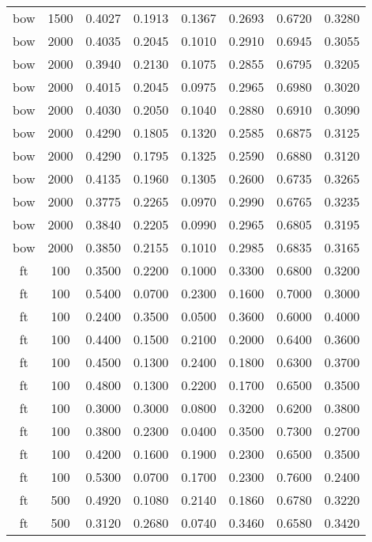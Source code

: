 \begin{scriptsize}
\begin{longtable}{cccccccc}
	bow      & 1500 & 0.4027 & 0.1913 & 0.1367 & 0.2693 & 0.6720 & 0.3280 \\
	bow      & 2000 & 0.4035 & 0.2045 & 0.1010 & 0.2910 & 0.6945 & 0.3055 \\
	bow      & 2000 & 0.3940 & 0.2130 & 0.1075 & 0.2855 & 0.6795 & 0.3205 \\
	bow      & 2000 & 0.4015 & 0.2045 & 0.0975 & 0.2965 & 0.6980 & 0.3020 \\
	bow      & 2000 & 0.4030 & 0.2050 & 0.1040 & 0.2880 & 0.6910 & 0.3090 \\
	bow      & 2000 & 0.4290 & 0.1805 & 0.1320 & 0.2585 & 0.6875 & 0.3125 \\
	bow      & 2000 & 0.4290 & 0.1795 & 0.1325 & 0.2590 & 0.6880 & 0.3120 \\
	bow      & 2000 & 0.4135 & 0.1960 & 0.1305 & 0.2600 & 0.6735 & 0.3265 \\
	bow      & 2000 & 0.3775 & 0.2265 & 0.0970 & 0.2990 & 0.6765 & 0.3235 \\
	bow      & 2000 & 0.3840 & 0.2205 & 0.0990 & 0.2965 & 0.6805 & 0.3195 \\
	bow      & 2000 & 0.3850 & 0.2155 & 0.1010 & 0.2985 & 0.6835 & 0.3165 \\
	ft       & 100  & 0.3500 & 0.2200 & 0.1000 & 0.3300 & 0.6800 & 0.3200 \\
	ft       & 100  & 0.5400 & 0.0700 & 0.2300 & 0.1600 & 0.7000 & 0.3000 \\
	ft       & 100  & 0.2400 & 0.3500 & 0.0500 & 0.3600 & 0.6000 & 0.4000 \\
	ft       & 100  & 0.4400 & 0.1500 & 0.2100 & 0.2000 & 0.6400 & 0.3600 \\
	ft       & 100  & 0.4500 & 0.1300 & 0.2400 & 0.1800 & 0.6300 & 0.3700 \\
	ft       & 100  & 0.4800 & 0.1300 & 0.2200 & 0.1700 & 0.6500 & 0.3500 \\
	ft       & 100  & 0.3000 & 0.3000 & 0.0800 & 0.3200 & 0.6200 & 0.3800 \\
	ft       & 100  & 0.3800 & 0.2300 & 0.0400 & 0.3500 & 0.7300 & 0.2700 \\
	ft       & 100  & 0.4200 & 0.1600 & 0.1900 & 0.2300 & 0.6500 & 0.3500 \\
	ft       & 100  & 0.5300 & 0.0700 & 0.1700 & 0.2300 & 0.7600 & 0.2400 \\
	ft       & 500  & 0.4920 & 0.1080 & 0.2140 & 0.1860 & 0.6780 & 0.3220 \\
	ft       & 500  & 0.3120 & 0.2680 & 0.0740 & 0.3460 & 0.6580 & 0.3420 \\

\end{longtable}
\end{scriptsize}
